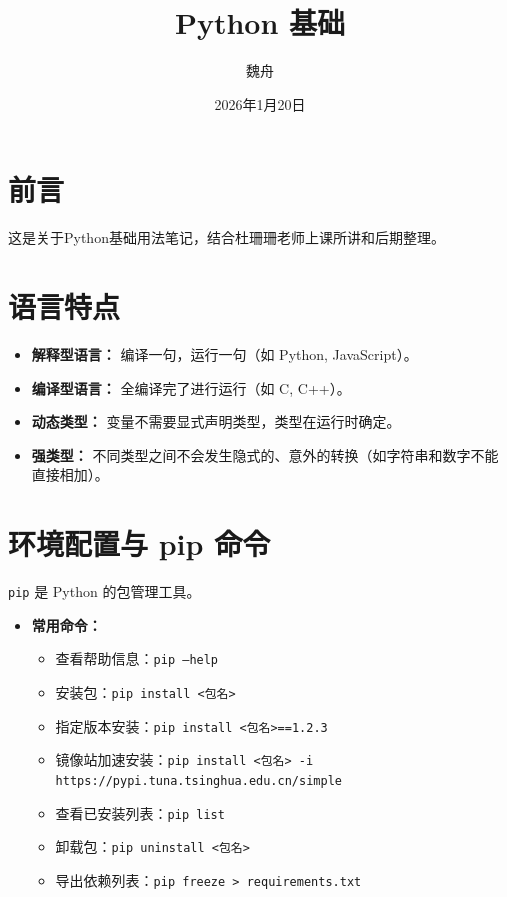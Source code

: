 \documentclass{article}
\title{Python 基础}
\author{魏舟}
\date{2026年1月20日}
\begin{document}
\maketitle

\newpage
\tableofcontents
\newpage
\section{前言}
这是关于Python基础用法笔记，结合杜珊珊老师上课所讲和后期整理。

\section{语言特点}
\begin{itemize}
    \item \textbf{解释型语言：} 编译一句，运行一句（如 Python, JavaScript）。
    \item \textbf{编译型语言：} 全编译完了进行运行（如 C, C++）。
    \item \textbf{动态类型：} 变量不需要显式声明类型，类型在运行时确定。
    \item \textbf{强类型：} 不同类型之间不会发生隐式的、意外的转换（如字符串和数字不能直接相加）。
\end{itemize}

\section{环境配置与 pip 命令}
\texttt{pip} 是 Python 的包管理工具。

\begin{itemize}
    \item \textbf{常用命令：}
    \begin{itemize}
        \item 查看帮助信息：\texttt{pip --help}
        \item 安装包：\texttt{pip install <包名>}
        \item 指定版本安装：\texttt{pip install <包名>==1.2.3}
        \item 镜像站加速安装：\texttt{pip install <包名> -i https://pypi.tuna.tsinghua.edu.cn/simple}
        \item 查看已安装列表：\texttt{pip list}
        \item 卸载包：\texttt{pip uninstall <包名>}
        \item 导出依赖列表：\texttt{pip freeze > requirements.txt}
    \end{itemize}
\end{itemize}
\end{document}
